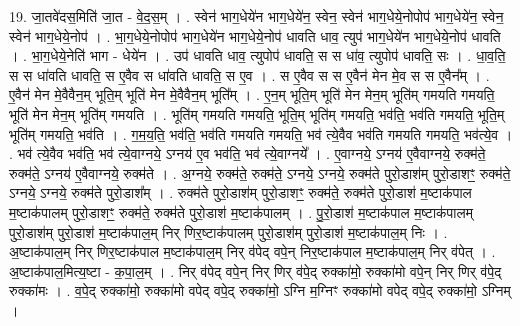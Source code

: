 \documentclass[17pt]{extarticle}
\begin{document}
19. जा॒तवे॑दस॒मिति॑ जा॒त - वे॒द॒स॒म् । . स्वेन॑ भाग॒धेये॑न भाग॒धेये॑न॒ स्वेन॒ स्वेन॑ भाग॒धेये॒नोपोप॑ भाग॒धेये॑न॒ स्वेन॒ स्वेन॑ भाग॒धेये॒नोप॑ । . भा॒ग॒धेये॒नोपोप॑ भाग॒धेये॑न भाग॒धेये॒नोप॑ धावति धाव॒ त्युप॑ भाग॒धेये॑न भाग॒धेये॒नोप॑ धावति । . भा॒ग॒धेये॒नेति॑ भाग - धेये॑न । . उप॑ धावति धाव॒ त्युपोप॑ धावति॒ स स धा॑व॒ त्युपोप॑ धावति॒ सः । . धा॒व॒ति॒ स स धा॑वति धावति॒ स ए॒वैव स धा॑वति धावति॒ स ए॒व । . स ए॒वैव स स ए॒वैन॑ मेन मे॒व स स ए॒वैन᳚म् । . ए॒वैन॑ मेन मे॒वैवैन॒म् भूति॒म् भूति॑ मेन मे॒वैवैन॒म् भूति᳚म् । . ए॒न॒म् भूति॒म् भूति॑ मेन मेन॒म् भूति॑म् गमयति गमयति॒ भूति॑ मेन मेन॒म् भूति॑म् गमयति । . भूति॑म् गमयति गमयति॒ भूति॒म् भूति॑म् गमयति॒ भव॑ति॒ भव॑ति गमयति॒ भूति॒म् भूति॑म् गमयति॒ भव॑ति । . ग॒म॒य॒ति॒ भव॑ति॒ भव॑ति गमयति गमयति॒ भव॑ त्ये॒वैव भव॑ति गमयति गमयति॒ भव॑त्ये॒व । . भव॑ त्ये॒वैव भव॑ति॒ भव॑ त्ये॒वाग्नये॒ ऽग्नय॑ ए॒व भव॑ति॒ भव॑ त्ये॒वाग्नये᳚ । . ए॒वाग्नये॒ ऽग्नय॑ ए॒वैवाग्नये॒ रुक्म॑ते॒ रुक्म॑ते॒ ऽग्नय॑ ए॒वैवाग्नये॒ रुक्म॑ते । . अ॒ग्नये॒ रुक्म॑ते॒ रुक्म॑ते॒ ऽग्नये॒ ऽग्नये॒ रुक्म॑ते पुरो॒डाश॑म् पुरो॒डाशꣳ॒॒ रुक्म॑ते॒ ऽग्नये॒ ऽग्नये॒ रुक्म॑ते पुरो॒डाश᳚म् । . रुक्म॑ते पुरो॒डाश॑म् पुरो॒डाशꣳ॒॒ रुक्म॑ते॒ रुक्म॑ते पुरो॒डाश॑ म॒ष्टाक॑पाल म॒ष्टाक॑पालम् पुरो॒डाशꣳ॒॒ रुक्म॑ते॒ रुक्म॑ते पुरो॒डाश॑ म॒ष्टाक॑पालम् । . पु॒रो॒डाश॑ म॒ष्टाक॑पाल म॒ष्टाक॑पालम् पुरो॒डाश॑म् पुरो॒डाश॑ म॒ष्टाक॑पाल॒म् निर् णिर॒ष्टाक॑पालम् पुरो॒डाश॑म् पुरो॒डाश॑ म॒ष्टाक॑पाल॒म् निः । . अ॒ष्टाक॑पाल॒म् निर् णिर॒ष्टाक॑पाल म॒ष्टाक॑पाल॒म् निर् व॑पेद् वपे॒न् निर॒ष्टाक॑पाल म॒ष्टाक॑पाल॒म् निर् व॑पेत् । . अ॒ष्टाक॑पाल॒मित्य॒ष्टा - क॒पा॒ल॒म् । . निर् व॑पेद् वपे॒न् निर् णिर् व॑पे॒द् रुक्का॑मो॒ रुक्का॑मो वपे॒न् निर् णिर् व॑पे॒द् रुक्का॑मः । . व॒पे॒द् रुक्का॑मो॒ रुक्का॑मो वपेद् वपे॒द् रुक्का॑मो॒ ऽग्नि म॒ग्निꣳ रुक्का॑मो वपेद् वपे॒द् रुक्का॑मो॒ ऽग्निम् । \newline
\end{document}
